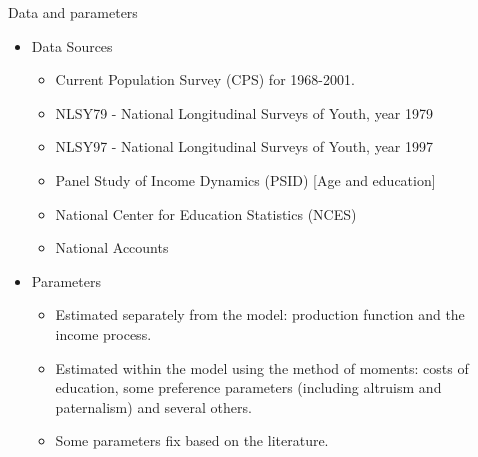\documentclass{beamer}
\begin{document}
\begin{frame}[label=Return1]{Data and parameters}
\begin{itemize}
\item Data Sources
\begin{itemize}

\item Current Population Survey (CPS) for 1968-2001.
\item NLSY79 - National Longitudinal Surveys of Youth, year 1979
\item NLSY97 - National Longitudinal Surveys of Youth, year 1997
\item Panel Study of Income Dynamics (PSID) [Age and education]
\item National Center for Education Statistics (NCES)
\item National Accounts
\end{itemize}
\item Parameters

\begin{itemize}
\item Estimated separately from the model: production function and the income process.
\item Estimated within the model using the method of moments: costs of education, some preference parameters (including altruism and paternalism) and several others.
\hyperlink{supplemental}{} \hyperlink{Production1}{} 

\item Some parameters fix based on the literature.
\hyperlink{supplemental}{}
\hyperlink{supplemental1}{}
\end{itemize}

\end{itemize}

\end{frame}
\end{document}
